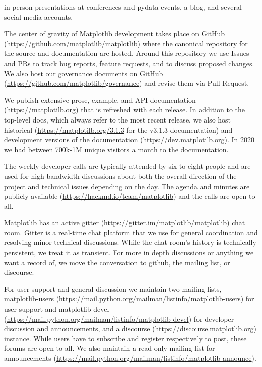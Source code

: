 \documentclass[12pt]{article}
\numberwithin{page}{section}
\begin{document}
in-person presentations at conferences and pydata events,
a blog, and several social media accounts.


The center of gravity of Matplotlib development takes place on GitHub
(\url{https://github.com/matplotlib/matplotlib}) where the canonical
repository for the source and documentation are hosted.  Around this
repository we use Issues and PRs to track bug reports, feature
requests, and to discuss proposed changes.  We also host our
governance documents on GitHub
(\url{https://github.com/matplotlib/governance}) and revise them via
Pull Request.

We publish extensive prose, example, and API documentation
(\url{https://matplotilb.org}) that is refreshed with each release.
In addition to the top-level docs, which always refer to the most
recent release, we also host historical
(\url{https://matplotilb.org/3.1.3} for the v3.1.3 documentation) and
development versions of the documentation
(\url{https://dev.matplotilb.org}).  In 2020 we had between 700k-1M
unique visitors a month to the documentation.


The weekly developer calls are typically attended by six to eight
people and are used for high-bandwidth discussions about both the
overall direction of the project and technical issues depending on the
day.  The agenda and minutes are publicly available
(\url{https://hackmd.io/team/matplotlib}) and the calls are open to
all.

Matplotlib has an active gitter
(\url{https://gitter.im/matplotlib/matplotlib}) chat room.  Gitter is
a real-time chat platform that we use for general coordination and
resolving minor technical discussions.  While the chat room's history
is technically persistent, we treat it as transient.  For more in
depth discussions or anything we want a record of, we move the
conversation to github, the mailing list, or discourse.

For user support and general discussion we maintain two mailing lists,
matplotlib-users
(\url{https://mail.python.org/mailman/listinfo/matplotlib-users}) for
user support and matplotlib-devel
(\url{https://mail.python.org/mailman/listinfo/matplotlib-devel}) for
developer discussion and announcements, and a discourse
(\url{https://discourse.matplotlib.org}) instance.  While users have
to subscribe and register respectively to post, these forums are open
to all.  We also maintain a read-only mailing list for announcements
(\url{https://mail.python.org/mailman/listinfo/matplotlib-announce}).
\end{document}
